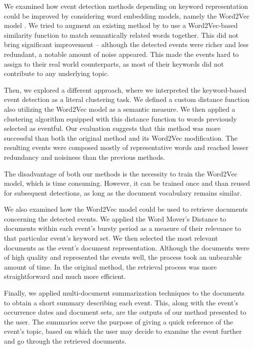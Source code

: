 We examined how event detection methods depending on keyword representation could be improved by considering word embedding models, namely the Word2Vec model \citep{word2vec}. We tried to augment an existing method by \cite{event-detection} to use a Word2Vec-based similarity function to match semantically related words together. This did not bring significant improvement -- although the detected events were richer and less redundant, a notable amount of noise appeared. This made the events hard to assign to their real world counterparts, as most of their keywords did not contribute to any underlying topic.

Then, we explored a different approach, where we interpreted the keyword-based event detection as a literal clustering task. We defined a custom distance function also utilizing the Word2Vec model as a semantic measure. We then applied a clustering algorithm equipped with this distance function to words previously selected as eventful. Our evaluation suggests that this method was more successful than both the original method and its Word2Vec modification. The resulting events were composed mostly of representative words and reached lesser redundancy and noisiness than the previous methods.

The disadvantage of both our methods is the necessity to train the Word2Vec model, which is time consuming. However, it can be trained once and than reused for subsequent detections, as long as the document vocabulary remains similar.

We also examined how the Word2Vec model could be used to retrieve documents concerning the detected events. We applied the Word Mover's Distance \citep{wmd} to documents within each event's bursty period as a measure of their relevance to that particular event's keyword set. We then selected the most relevant documents as the event's document representation. Although the documents were of high quality and represented the events well, the process took an unbearable amount of time. In the original method, the retrieval process was more straightforward and much more efficient.

Finally, we applied multi-document summarization techniques to the documents to obtain a short summary describing each event. This, along with the event's occurrence dates and document sets, are the outputs of our method presented to the user. The summaries serve the purpose of giving a quick reference of the event's topic, based on which the user may decide to examine the event further and go through the retrieved documents.

